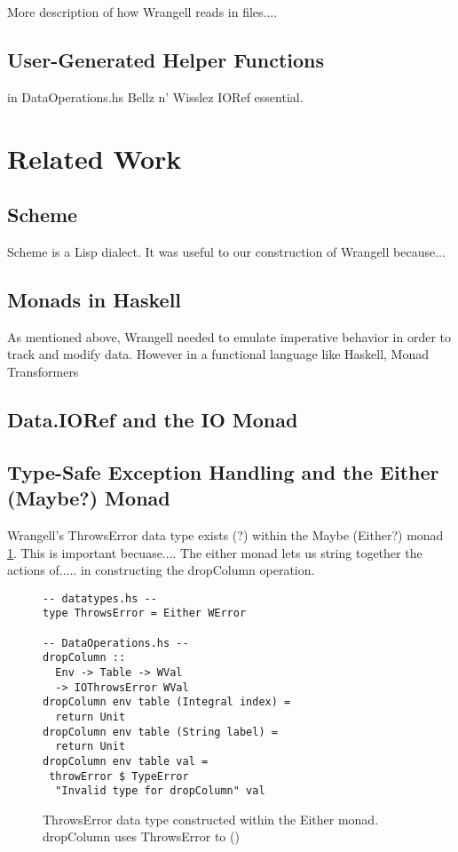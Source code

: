 \documentclass[preprint,nocopyrightspace]{sig-alternate}
\begin{document}
More description of how Wrangell reads in files....  

\subsection{User-Generated Helper Functions}
in DataOperations.hs
Bellz n' Wisslez
IORef essential. 

\section{Related Work}

\subsection{Scheme}
Scheme is a Lisp dialect. It was useful to our construction of Wrangell because...
\cite{scheme}

\subsection{Monads in Haskell}
As mentioned above, Wrangell needed to emulate imperative behavior in order to track and modify data. However in a functional language like Haskell, 
Monad Transformers \citep{monadTransform}






\subsection{Data.IORef and the IO Monad}

\subsection{Type-Safe Exception Handling and the Either (Maybe?) Monad}
Wrangell's ThrowsError data type exists (?) within the Maybe (Either?) monad  \ref{eitherThrowsError}.
This is important becuase....
The either monad lets us string together the actions of..... in constructing the dropColumn operation. 
\begin{figure}
\caption{ThrowsError data type constructed within the Either monad. dropColumn uses ThrowsError to ()}
\label{eitherThrowsError}
\begin{lstlisting}
-- datatypes.hs -- 
type ThrowsError = Either WError

-- DataOperations.hs --
dropColumn :: 
  Env -> Table -> WVal 
  -> IOThrowsError WVal
dropColumn env table (Integral index) = 
  return Unit
dropColumn env table (String label) = 
  return Unit
dropColumn env table val =
 throwError $ TypeError 
  "Invalid type for dropColumn" val
\end{lstlisting}
\end{figure} 
\end{document}
